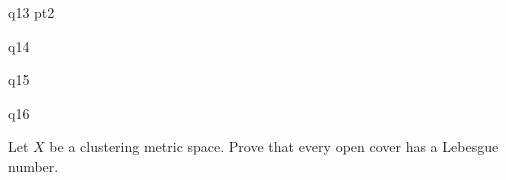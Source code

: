 \documentclass{article}
\begin{document}
\begin{qu}
    q13 pt2
\end{qu}

\newpage
{}

\begin{qu}
    q14
\end{qu}

\newpage
{}

\begin{qu}
    q15
\end{qu}

\newpage
{}

\begin{qu}
    q16
\end{qu}

\newpage
{}

\begin{qu}[title=Lebesgue Number Lemma]
    Let $ X $ be a clustering metric space. Prove that every open cover has a Lebesgue number.
\end{qu}
\end{document}
